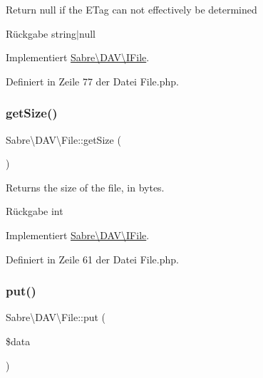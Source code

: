 Return null if the E\+Tag can not effectively be determined

\begin{DoxyReturn}{Rückgabe}
string$\vert$null 
\end{DoxyReturn}


Implementiert \mbox{\hyperlink{interface_sabre_1_1_d_a_v_1_1_i_file_a2b207a6037dcbd4e7373b977dc60117f}{Sabre\textbackslash{}\+D\+A\+V\textbackslash{}\+I\+File}}.



Definiert in Zeile 77 der Datei File.\+php.

\mbox{\label{class_sabre_1_1_d_a_v_1_1_file_ac50c6e65d39734d7858e95f080a46f4b}} 
\subsubsection{\texorpdfstring{get\+Size()}{getSize()}}
{\footnotesize\ttfamily Sabre\textbackslash{}\+D\+A\+V\textbackslash{}\+File\+::get\+Size (\begin{DoxyParamCaption}{ }\end{DoxyParamCaption})}

Returns the size of the file, in bytes.

\begin{DoxyReturn}{Rückgabe}
int 
\end{DoxyReturn}


Implementiert \mbox{\hyperlink{interface_sabre_1_1_d_a_v_1_1_i_file_aa1534e00805f45d9282de9c699dbe178}{Sabre\textbackslash{}\+D\+A\+V\textbackslash{}\+I\+File}}.



Definiert in Zeile 61 der Datei File.\+php.

\mbox{\label{class_sabre_1_1_d_a_v_1_1_file_a09e6952358a011032662e1371c5aa514}} 
\subsubsection{\texorpdfstring{put()}{put()}}
{\footnotesize\ttfamily Sabre\textbackslash{}\+D\+A\+V\textbackslash{}\+File\+::put (\begin{DoxyParamCaption}\item[{}]{\$data }\end{DoxyParamCaption})}

